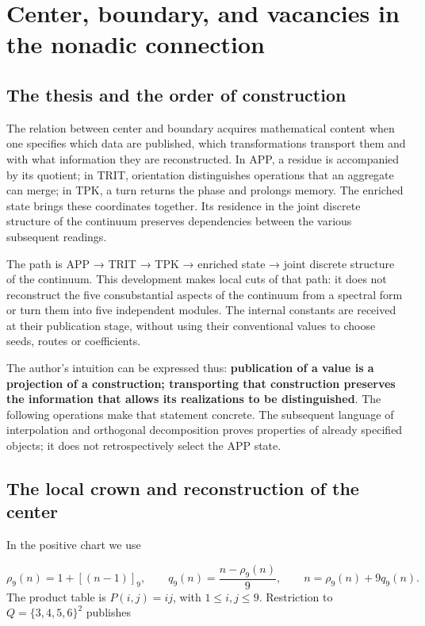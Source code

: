 \section{Center, boundary, and vacancies in the nonadic connection}
\label{viii:sec:centro-frontera}
\subsection{The thesis and the order of construction}
The relation between center and boundary acquires mathematical content when one specifies which data are published, which transformations transport them and with what information they are reconstructed. In APP, a residue is accompanied by its quotient; in TRIT, orientation distinguishes operations that an aggregate can merge; in TPK, a turn returns the phase and prolongs memory. The enriched state brings these coordinates together. Its residence in the joint discrete structure of the continuum preserves dependencies between the various subsequent readings.

The path is APP → TRIT → TPK → enriched state → joint discrete structure of the continuum. This development makes local cuts of that path: it does not reconstruct the five consubstantial aspects of the continuum from a spectral form or turn them into five independent modules. The internal constants are received at their publication stage, without using their conventional values to choose seeds, routes or coefficients.

The author's intuition can be expressed thus: \textbf{publication of a value is a projection of a construction; transporting that construction preserves the information that allows its realizations to be distinguished}. The following operations make that statement concrete. The subsequent language of interpolation and orthogonal decomposition proves properties of already specified objects; it does not retrospectively select the APP state.

\subsection{The local crown and reconstruction of the center}
In the positive chart we use

\[
\rho_9(n)=1+[(n-1)]_9,\qquad
q_9(n)=\frac{n-\rho_9(n)}9,
\qquad n=\rho_9(n)+9q_9(n).
\]
The product table is \(P(i,j)=ij\), with \(1\leq i,j\leq9\). Restriction to \(Q=\{3,4,5,6\}^2\) publishes

